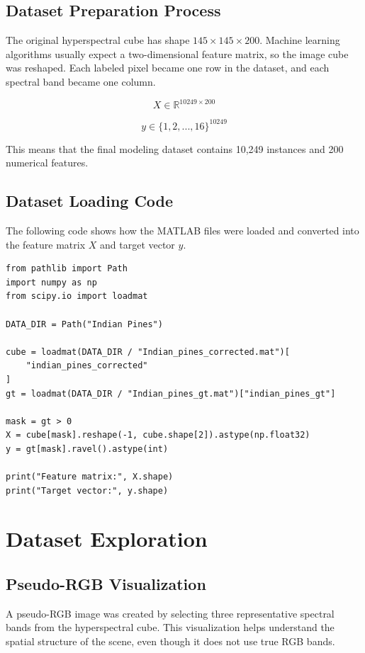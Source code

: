 \documentclass[12pt,a4paper]{article}
\begin{document}
\subsection{Dataset Preparation Process}

The original hyperspectral cube has shape $145 \times 145 \times 200$. Machine learning algorithms usually expect a two-dimensional feature matrix, so the image cube was reshaped. Each labeled pixel became one row in the dataset, and each spectral band became one column.

\[
X \in \mathbb{R}^{10249 \times 200}
\]

\[
y \in \{1, 2, ..., 16\}^{10249}
\]

This means that the final modeling dataset contains 10,249 instances and 200 numerical features.

\subsection{Dataset Loading Code}

The following code shows how the MATLAB files were loaded and converted into the feature matrix $X$ and target vector $y$.

\begin{lstlisting}
from pathlib import Path
import numpy as np
from scipy.io import loadmat

DATA_DIR = Path("Indian Pines")

cube = loadmat(DATA_DIR / "Indian_pines_corrected.mat")[
    "indian_pines_corrected"
]
gt = loadmat(DATA_DIR / "Indian_pines_gt.mat")["indian_pines_gt"]

mask = gt > 0
X = cube[mask].reshape(-1, cube.shape[2]).astype(np.float32)
y = gt[mask].ravel().astype(int)

print("Feature matrix:", X.shape)
print("Target vector:", y.shape)
\end{lstlisting}

\section{Dataset Exploration}

\subsection{Pseudo-RGB Visualization}

A pseudo-RGB image was created by selecting three representative spectral bands from the hyperspectral cube. This visualization helps understand the spatial structure of the scene, even though it does not use true RGB bands.
\end{document}

